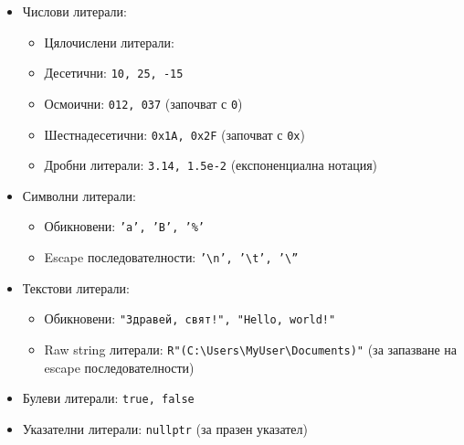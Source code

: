 \documentclass[oneside]{book}
\newcommand*{\code}[1]{\texttt{#1}}
\newcommand*{\bs}{\textbackslash}
\begin{document}
\begin{itemize}
    \item Числови литерали:
    
    \begin{itemize}
        \item Цялочислени литерали:
        \item[] Десетични: \code{10, 25, -15}
        \item[] Осмоични: \code{012, 037} (започват с \code{0})
        \item[] Шестнадесетични: \code{0x1A, 0x2F} (започват с \code{0x})
        \item Дробни литерали: \code{3.14, 1.5e-2} (експоненциална нотация)
    \end{itemize}
    
    \item Символни литерали:
    
    \begin{itemize}
        \item Обикновени: \code{'a', 'B', '\%'}
        \item Escape последователности: \code{'\bs n', '\bs t', '\bs ''}
    \end{itemize}
    \item Текстови литерали:
    
    \begin{itemize}
        \item Обикновени: \code{"Здравей, свят!", "Hello, world!"}
        \item Raw string литерали: \code{R"(C:\bs Users\bs MyUser\bs Documents)"} (за запазване на escape последователности)
    \end{itemize}
    \item Булеви литерали: \code{true, false}
    \item Указателни литерали: \code{nullptr} (за празен указател)
\end{itemize}
\end{document}
